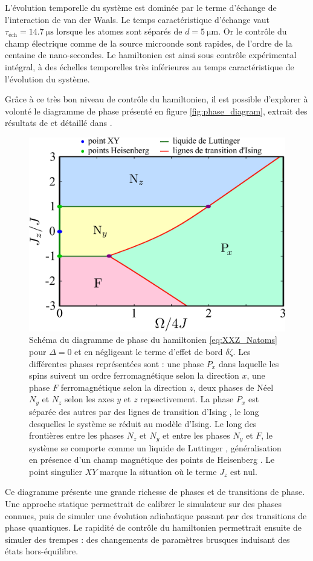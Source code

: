 L'évolution temporelle du système est dominée par le terme d'échange de l'interaction de van der Waals.
Le temps caractéristique d'échange vaut $\tau_{\text{\'ech}} = \SI{14.7}{\us}$ lorsque les atomes sont séparés de $d=\SI{5}{\um}$.
Or le contrôle du champ électrique comme de la source microonde sont rapides, de l'ordre de la centaine de nano-secondes.
Le hamiltonien est ainsi sous contrôle expérimental intégral, à des échelles temporelles très inférieures au temps caractéristique de l'évolution du système.

Grâce à ce très bon niveau de contrôle du hamiltonien, il est possible d'explorer à volonté le diagramme de phase présenté en figure \eqref{fig:phase_diagram}, extrait des résultats de \cite{MX_DMITRIEV02} et détaillé dans \cite{ENS_PRE_CIRCSIM}.
%
\begin{figure}[!h]
\centering
\includegraphics[width=0.7\linewidth]{figures/circsim/phase_diagram}
\caption[Diagramme de phase XXZ]{
Schéma du diagramme de phase du hamiltonien \eqref{eq:XXZ_Natoms} pour $\Delta=0$ et en négligeant le terme d'effet de bord $\delta\zeta$.
Les différentes phases représentées sont : une phase $P_x$ dans laquelle les spins suivent un ordre ferromagnétique selon la direction $x$, une phase $F$ ferromagnétique selon la direction $z$, deux phases de Néel $N_y$ et $N_z$ selon les axes $y$ et $z$ repsectivement.
La phase $P_x$ est séparée des autres par des lignes \og de transition d'Ising \fg{}, le long desquelles le système se réduit au modèle d'Ising.
Le long des frontières entre les phases $N_z$ et $N_y$ et entre les phases $N_y$ et $F$, le système se comporte comme un \og liquide de Luttinger \fg{}, généralisation en présence d'un champ magnétique des \og points de Heisenberg \fg{}.
Le point singulier $XY$ marque la situation où le terme $J_z$ est nul.
}
\label{fig:phase_diagram}
\end{figure}
%
Ce diagramme présente une grande richesse de phases et de transitions de phase.
Une approche statique permettrait de calibrer le simulateur sur des phases connues, puis de simuler une évolution adiabatique passant par des transitions de phase quantiques.
Le rapidité de contrôle du hamiltonien permettrait ensuite de simuler des trempes : des changements de paramètres brusques induisant des états hors-équilibre.

